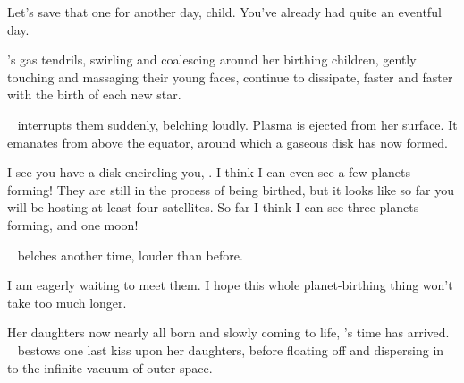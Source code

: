 \documentclass[main.tex]{subfiles}
\begin{document}


\par \Pleione Let's save that one for another day, child.  You've already had quite an eventful day.

\par \nar \rmpleione's gas tendrils, swirling and coalescing around her birthing children, gently touching and massaging their young faces, continue to dissipate, faster and faster with the birth of each new star.

\par \nar \rmelectra~ interrupts them suddenly, belching loudly.  Plasma is ejected from her surface.  It emanates from above the equator, around which a gaseous disk has now formed.  

\par \Maia I see you have a disk encircling you, \rmelectra.  I think I can even see a few planets forming!  They are still in the process of being birthed, but it looks like so far you will be hosting at least four satellites.  So far I think I can see three planets forming, and one moon!

\par \nar \rmelectra~ belches another time, louder than before.

\par \Electra I am eagerly waiting to meet them.  I hope this whole planet-birthing thing won't take too much longer.


\par \nar Her daughters now nearly all born and slowly coming to life, \rmpleione's time has arrived. \rmpleione~ bestows one last kiss upon her daughters, before floating off and dispersing in to the infinite vacuum of outer space.
\end{document}
